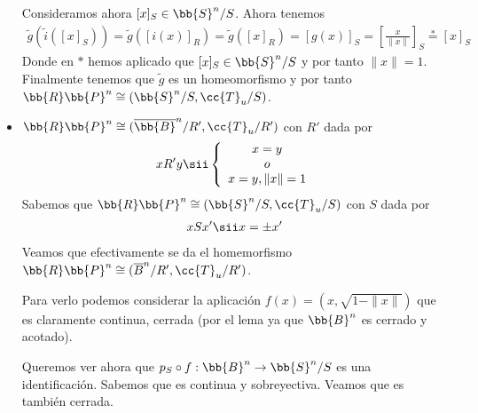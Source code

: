 \begin{ejemplo}
\begin{itemize}
        Consideramos ahora $[x]_S\in \bb{S}^n/S$. Ahora tenemos
        \begin{align*}
            \tilde{g}(\tilde{i}([x]_S)) = \tilde{g}([i(x)]_R) = \tilde{g}([x]_R) = \left[g(x)\right]_S= \left[\frac{x}{\|x\|}\right]_S \overset{\ast}{=}[x]_S
        \end{align*}
        Donde en $\ast$ hemos aplicado que $[x]_S \in \bb{S}^n/S$ y por tanto $\|x\|=1$.\\
        Finalmente tenemos que $\tilde{g}$ es un homeomorfismo y por tanto 
        $\bb{R}\bb{P}^n \cong (\bb{S}^n/S, \cc{T}_u/S)$.

        \item $\bb{R}\bb{P}^n \cong (\overline{\bb{B}}^n/R', \cc{T}_u/R')$ con $R'$ dada por 
        \begin{align*}
            xR'y \sii \left\{
            \begin{array}{c}
                x=y\\
                o\\
                x=y, \|x\|=1
            \end{array}
            \right.
        \end{align*}
        Sabemos que  $\bb{R}\bb{P}^n \cong (\bb{S}^n/S, \cc{T}_u/S)$ con $S$ dada por 
        \begin{align*}
            xSx' \sii x= \pm x'
        \end{align*}
        Veamos que efectivamente se da el homemorfismo $\bb{R}\bb{P}^n \cong (\overline{B}^n/R', \cc{T}_u/R')$. 

        Para verlo podemos considerar la aplicación $f(x)=(x, \sqrt{1-\|x\|})$ que es claramente continua, cerrada (por el lema ya que $\bb{B}^n$ es cerrado y acotado).

        \begin{figure}[H]
            \centering
        \end{figure}

        Queremos ver ahora que $p_S \circ f:\bb{B}^n \to \bb{S}^n/S$ es una identificación. Sabemos que es continua y sobreyectiva. Veamos que es también cerrada. \\


\end{itemize}
\end{ejemplo}
